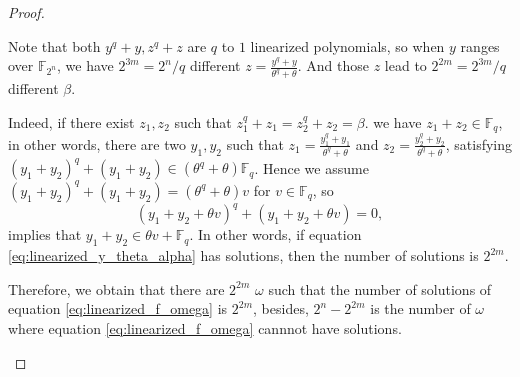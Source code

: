 \documentclass[12 pt]{article}
\def\F{{\mathbb F}}
\begin{document}
\begin{proof}
\begin{enumerate}[label=(\arabic{*})]
    Note that both $ y^q+y,z^q+z $ are $ q $ to $ 1 $ linearized polynomials, so when $ y $ ranges over $ \F_{2^n} $, 
    we have $ 2^{3m}=2^n/q $ different $ z=\frac{y^q+y}{\theta^q+\theta} $. And those $ z $ lead to $ 2^{2m}=2^{3m}/q $ 
    different $ \beta $. 
    
    Indeed, %
    if there exist $ z_1,z_2 $ such that $ z_1^q+z_1=z_2^q+z_2=\beta $. we have 
    $ z_1+z_2\in\F_q $, in other words, there are two $ y_1,y_2 $ such that $ z_1=\frac{y_1^q+y_1}{\theta^q+\theta} $ 
    and $ z_2=\frac{y_2^q+y_2}{\theta^q+\theta} $, satisfying $  (y_1+y_2)^q+(y_1+y_2)\in\left( \theta^q+\theta \right)\F_q $. 
    Hence we assume $ (y_1+y_2)^q+(y_1+y_2)=\left( \theta^q+\theta \right)v $ for $ v\in\F_q $, so 
    \[(y_1+y_2+\theta v)^q+(y_1+y_2+\theta v)=0,\]
    implies that $ y_1+y_2\in \theta v+\F_q $. 
    In other words, if equation \eqref{eq:linearized_y_theta_alpha} has solutions, then the number of solutions is $ 2^{2m} $.

    Therefore, we obtain that there are $ 2^{2m} $ $ \omega $ 
    such that the number of solutions of equation \eqref{eq:linearized_f_omega} is $ 2^{2m} $, besides, 
    $ 2^{n}-2^{2m} $ is the number of $ \omega $ where equation \eqref{eq:linearized_f_omega} cannnot have solutions.


\end{enumerate}
\end{proof}
\end{document}
